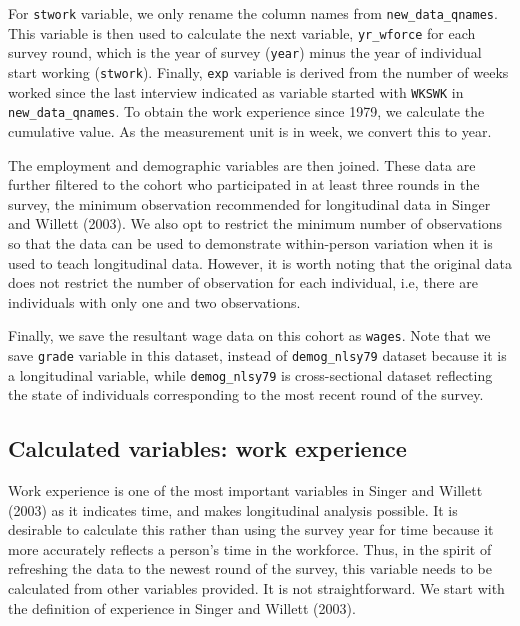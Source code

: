 \documentclass{article}
\begin{document}
For \texttt{stwork} variable, we only rename the column names from \texttt{new\_data\_qnames}. This variable is then used to calculate the next variable, \texttt{yr\_wforce} for each survey round, which is the year of survey (\texttt{year}) minus the year of individual start working (\texttt{stwork}). Finally, \texttt{exp} variable is derived from the number of weeks worked since the last interview indicated as variable started with \texttt{WKSWK} in \texttt{new\_data\_qnames}. To obtain the work experience since 1979, we calculate the cumulative value. As the measurement unit is in week, we convert this to year.

The employment and demographic variables are then joined. These data are further filtered to the cohort who participated in at least three rounds in the survey, the minimum observation recommended for longitudinal data in Singer and Willett (2003). We also opt to restrict the minimum number of observations so that the data can be used to demonstrate within-person variation when it is used to teach longitudinal data. However, it is worth noting that the original data does not restrict the number of observation for each individual, i.e, there are individuals with only one and two observations.

Finally, we save the resultant wage data on this cohort as \texttt{wages}. Note that we save \texttt{grade} variable in this dataset, instead of \texttt{demog\_nlsy79} dataset because it is a longitudinal variable, while \texttt{demog\_nlsy79} is cross-sectional dataset reflecting the state of individuals corresponding to the most recent round of the survey.

\hypertarget{calculated-variables-work-experience}{%
\subsection{Calculated variables: work experience}\label{calculated-variables-work-experience}}

Work experience is one of the most important variables in Singer and Willett (2003) as it indicates time, and makes longitudinal analysis possible. It is desirable to calculate this rather than using the survey year for time because it more accurately reflects a person's time in the workforce. Thus, in the spirit of refreshing the data to the newest round of the survey, this variable needs to be calculated from other variables provided. It is not straightforward. We start with the definition of experience in Singer and Willett (2003).
\end{document}
